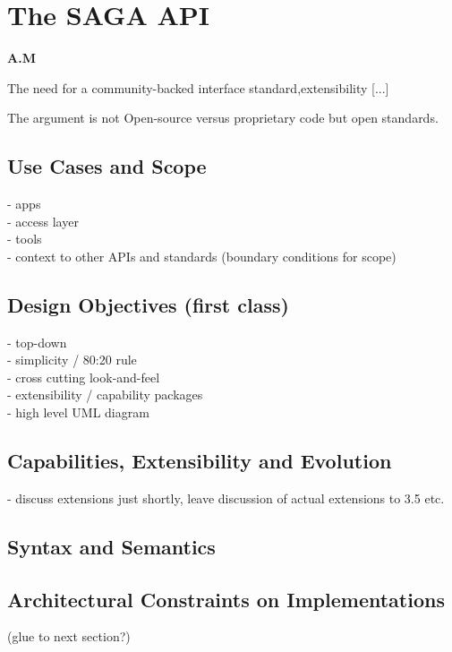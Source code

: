 
\section{The SAGA API} \textbf{A.M}

 The need for a community-backed interface standard,extensibility
 [...]


 The argument is not Open-source versus proprietary code but open
 standards. 



 \subsection{Use Cases and Scope}
  - apps\\
  - access layer\\
  - tools\\
  - context to other APIs and standards (boundary conditions for scope)


 \subsection{Design Objectives (first class)}
  - top-down\\
  - simplicity / 80:20 rule\\
  - cross cutting look-and-feel\\
  - extensibility / capability packages\\

  - high level UML diagram\\


 \subsection{Capabilities, Extensibility and Evolution}
  - discuss extensions just shortly, leave discussion of actual extensions to
  3.5 etc.\\
  

 \subsection{Syntax and Semantics}


 \subsection{Architectural Constraints on Implementations}
   (glue to next section?)


